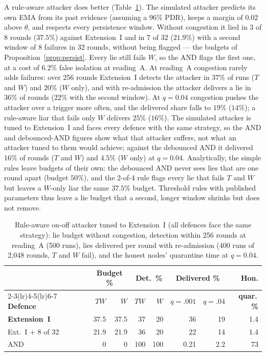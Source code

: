 \documentclass{ieeeaccess}
\begin{document}
A rule-aware attacker does better (Table~\ref{tab:aware}).  The
simulated attacker predicts its own EMA from its past evidence
(assuming a $96\%$ PDR), keeps a margin of $0.02$ above $\theta$, and
respects every persistence window.  Without congestion it lied in $3$ of
$8$ rounds ($37.5\%$) against Extension~I and in $7$ of $32$ ($21.9\%$)
with a second window of $8$ failures in $32$ rounds, without being
flagged --- the budgets of Proposition~\ref{prop:persist}.  Every lie
still fails $W$, so the AND flags the first one, at a cost of $6.2\%$
false isolation at reading~A.  At reading~A congestion rarely adds
failures: over 256 rounds Extension~I detects the attacker in $37\%$ of
runs ($T$ and $W$) and $20\%$ ($W$ only), and with re-admission the
attacker delivers a lie in $36\%$ of rounds ($22\%$ with the second
window).  At $q=0.04$ congestion pushes the attacker over a trigger more
often, and the delivered share falls to $19\%$ ($14\%$); a rule-aware
liar that fails only $W$ delivers $25\%$ ($16\%$).  The simulated
attacker is tuned to Extension~I and faces every defence with the
same strategy, so the AND and debounced-AND figures show what that
attacker suffers, not what an attacker tuned to them would achieve;
against the debounced AND it delivered $16\%$ of rounds ($T$ and $W$)
and $4.5\%$ ($W$ only) at $q=0.04$.  Analytically, the simple rules
leave budgets of their own: the debounced AND never sees lies that
are one round apart (budget $50\%$), and the 2-of-4 rule flags every
lie that fails $T$ and $W$ but leaves a $W$-only liar the same
$37.5\%$ budget.  Threshold rules with published parameters thus leave
a lie budget that a second, longer window shrinks but does not remove.

\begin{table}[!t]
\caption{Rule-aware on-off attacker tuned to Extension~I (all defences face the same strategy): lie budget without congestion, detection within 256 rounds at reading~A (500 runs), lies delivered per round with re-admission (400 runs of 2{,}048 rounds, $T$ and $W$ fail), and the honest nodes' quarantine time at $q=0.04$.}
\label{tab:aware}
\centering
\renewcommand{\arraystretch}{1.08}
\footnotesize
\setlength{\tabcolsep}{2.0pt}
\begin{tabular}{lrrrrrrr}
\toprule
 & \multicolumn{2}{c}{\textbf{Budget \%}} & \multicolumn{2}{c}{\textbf{Det.\ \%}} & \multicolumn{2}{c}{\textbf{Delivered \%}} & \textbf{Hon.} \\
\cmidrule(lr){2-3}\cmidrule(lr){4-5}\cmidrule(lr){6-7}
\textbf{Defence} & $TW$ & $W$ & $TW$ & $W$ & $q{=}.001$ & $q{=}.04$ & \textbf{quar.\,\%} \\
\midrule
\textbf{Extension~I} & 37.5 & 37.5 & 37 & 20 & 36 & 19 & 1.4 \\
Ext.~I + 8 of 32 & 21.9 & 21.9 & 36 & 20 & 22 & 14 & 1.4 \\
AND~\cite{soula2024iodt} & 0 & 0 & 100 & 100 & 0.21 & 2.2 & 73 \\
\bottomrule
\end{tabular}
\end{table}
\end{document}
